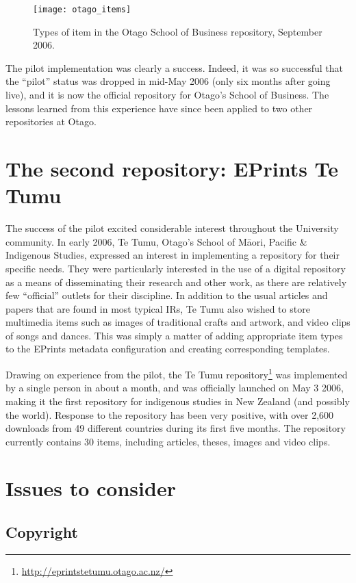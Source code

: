 \documentclass[12pt,pdftex,a4paper,titlepage]{article}
\begin{document}
\begin{figure}
	\centering
	\texttt{[image: otago\_items]}
	\caption{Types of item in the Otago School of Business repository, September 2006.}
	\label{fig-item-types}
\end{figure}


The pilot implementation was clearly a success. Indeed, it was so successful that the ``pilot'' status was dropped in mid-May 2006 (only six months after going live), and it is now the official repository for Otago's School of Business. The lessons learned from this experience have since been applied to two other repositories at Otago.


\section{The second repository: EPrints Te Tumu}

The success of the pilot excited considerable interest throughout the University community. In early 2006, Te Tumu, Otago's School of M\={a}ori, Pacific \& Indigenous Studies, expressed an interest in implementing a repository for their specific needs. They were particularly interested in the use of a digital repository as a means of disseminating their research and other work, as there are relatively few ``official'' outlets for their discipline. In addition to the usual articles and papers that are found in most typical IRs, Te Tumu also wished to store multimedia items such as images of traditional crafts and artwork, and video clips of songs and dances. This was simply a matter of adding  appropriate item types to the EPrints metadata configuration and creating corresponding templates.

Drawing on experience from the pilot, the Te Tumu repository\footnote{\url{http://eprintstetumu.otago.ac.nz/}} was implemented by a single person in about a month, and was officially launched on May 3 2006, making it the first repository for indigenous studies in New Zealand (and possibly the world). Response to the repository has been very positive, with over 2,600 downloads from 49 different countries during its first five months. The repository currently contains 30 items, including articles, theses, images and video clips.


\section{Issues to consider}


\subsection{Copyright}
\end{document}

